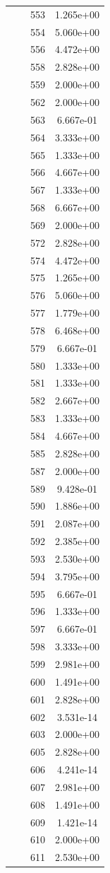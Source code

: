 \documentclass[12pt]{article}
\begin{document}
\begin{longtable}{@{}cccc@{}}
 &  & 553 & 1.265e+00 \\
 &  & 554 & 5.060e+00 \\
 &  & 556 & 4.472e+00 \\
 &  & 558 & 2.828e+00 \\
 &  & 559 & 2.000e+00 \\
 &  & 562 & 2.000e+00 \\
 &  & 563 & 6.667e-01 \\
 &  & 564 & 3.333e+00 \\
 &  & 565 & 1.333e+00 \\
 &  & 566 & 4.667e+00 \\
 &  & 567 & 1.333e+00 \\
 &  & 568 & 6.667e+00 \\
 &  & 569 & 2.000e+00 \\
 &  & 572 & 2.828e+00 \\
 &  & 574 & 4.472e+00 \\
 &  & 575 & 1.265e+00 \\
 &  & 576 & 5.060e+00 \\
 &  & 577 & 1.779e+00 \\
 &  & 578 & 6.468e+00 \\
 &  & 579 & 6.667e-01 \\
 &  & 580 & 1.333e+00 \\
 &  & 581 & 1.333e+00 \\
 &  & 582 & 2.667e+00 \\
 &  & 583 & 1.333e+00 \\
 &  & 584 & 4.667e+00 \\
 &  & 585 & 2.828e+00 \\
 &  & 587 & 2.000e+00 \\
 &  & 589 & 9.428e-01 \\
 &  & 590 & 1.886e+00 \\
 &  & 591 & 2.087e+00 \\
 &  & 592 & 2.385e+00 \\
 &  & 593 & 2.530e+00 \\
 &  & 594 & 3.795e+00 \\
 &  & 595 & 6.667e-01 \\
 &  & 596 & 1.333e+00 \\
 &  & 597 & 6.667e-01 \\
 &  & 598 & 3.333e+00 \\
 &  & 599 & 2.981e+00 \\
 &  & 600 & 1.491e+00 \\
 &  & 601 & 2.828e+00 \\
 &  & 602 & 3.531e-14 \\
 &  & 603 & 2.000e+00 \\
 &  & 605 & 2.828e+00 \\
 &  & 606 & 4.241e-14 \\
 &  & 607 & 2.981e+00 \\
 &  & 608 & 1.491e+00 \\
 &  & 609 & 1.421e-14 \\
 &  & 610 & 2.000e+00 \\
 &  & 611 & 2.530e+00 \\

\bottomrule
\end{longtable}
\end{document}
